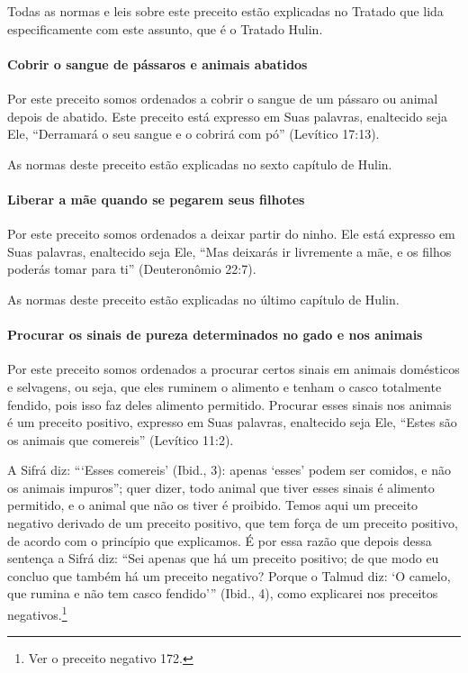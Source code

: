Todas as normas e leis sobre este preceito estão explicadas no Tratado
que lida especificamente com este assunto, que é o Tratado Hulin.

\paragraph{Cobrir o sangue de pássaros e animais abatidos}

Por este preceito somos ordenados a cobrir o sangue de um pássaro ou
animal depois de abatido. Este preceito está expresso em Suas palavras,
enaltecido seja Ele, ``Derramará o seu sangue e o cobrirá com pó''
(Levítico 17:13).

As normas deste preceito estão explicadas no sexto capítulo de Hulin.

\paragraph{Liberar a mãe quando se pegarem seus filhotes}

Por este preceito somos ordenados a deixar partir do ninho. Ele está
expresso em Suas palavras, enaltecido seja Ele, ``Mas deixarás ir
livremente a mãe, e os filhos poderás tomar para ti'' (Deuteronômio
22:7).

As normas deste preceito estão explicadas no último capítulo de Hulin.

\paragraph{Procurar os sinais de pureza determinados no gado e nos animais}

Por este preceito somos ordenados a procurar certos sinais em animais
domésticos e selvagens, ou seja, que eles ruminem o alimento e tenham o
casco totalmente fendido, pois isso faz deles alimento permitido.
Procurar esses sinais nos animais é um preceito positivo, expresso em
Suas palavras, enaltecido seja Ele, ``Estes são os animais que
comereis'' (Levítico 11:2).

A Sifrá diz: ```Esses comereis' (Ibid., 3): apenas `esses' podem ser
comidos, e não os animais impuros''; quer dizer, todo animal que tiver
esses sinais é alimento permitido, e o animal que não os tiver é
proibido. Temos aqui um preceito negativo derivado de um preceito
positivo, que tem força de um preceito positivo, de acordo com o
princípio que explicamos. É por essa razão que depois dessa sentença a
Sifrá diz: ``Sei apenas que há um preceito positivo; de que modo eu
concluo que também há um preceito negativo? Porque o Talmud diz: `O camelo, que rumina e não tem casco fendido''' (Ibid., 4),
como explicarei nos preceitos negativos.\footnote{Ver o preceito negativo 172.}

